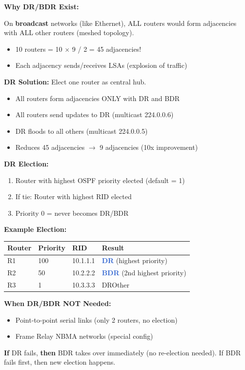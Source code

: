 \documentclass[12pt,a4paper]{article}
\begin{document}
\begin{abox}
\textbf{Why DR/BDR Exist:}

On \textbf{broadcast} networks (like Ethernet), ALL routers would form adjacencies with ALL other routers (meshed topology).
\begin{itemize}
    \item 10 routers = 10 $\times$ 9 / 2 = 45 adjacencies!
    \item Each adjacency sends/receives LSAs (explosion of traffic)
\end{itemize}

\textbf{DR Solution:} Elect one router as central hub.
\begin{itemize}
    \item All routers form adjacencies ONLY with DR and BDR
    \item All routers send updates to DR (multicast 224.0.0.6)
    \item DR floods to all others (multicast 224.0.0.5)
    \item Reduces 45 adjacencies $\rightarrow$ 9 adjacencies (10x improvement)
\end{itemize}

\textbf{DR Election:}
\begin{enumerate}
    \item Router with highest OSPF priority elected (default = 1)
    \item If tie: Router with highest RID elected
    \item Priority 0 = never becomes DR/BDR
\end{enumerate}

\textbf{Example Election:}
\begin{center}
\begin{tabular}{llll}
\toprule
Router & Priority & RID & Result \\
\midrule
R1 & 100 & 10.1.1.1 & \textcolor{highlight}{\textbf{DR}} (highest priority) \\
R2 & 50 & 10.2.2.2 & \textcolor{highlight}{\textbf{BDR}} (2nd highest priority) \\
R3 & 1 & 10.3.3.3 & DROther \\
\bottomrule
\end{tabular}
\end{center}

\textbf{When DR/BDR NOT Needed:}
\begin{itemize}
    \item Point-to-point serial links (only 2 routers, no election)
    \item Frame Relay NBMA networks (special config)
\end{itemize}

\textbf{If} DR fails, \textbf{then} BDR takes over immediately (no re-election needed). If BDR fails first, then new election happens.
\end{abox}
\end{document}
